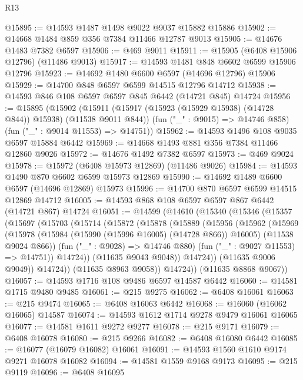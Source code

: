 \begin{lexlean}{R13}
\begin{coremodule}
@15895 := @14593 @1487 @1498 @9022 @9037 @15882 @15886
@15902 := @14668 @1484 @859 @356 @7384 @11466 @12787 @9013
@15905 := @14676 @1483 @7382 @6597
@15906 := @469 @9011
@15911 := @15905 (@6408 @15906 @12796) (@11486 @9013)
@15917 := @14593 @1481 @848 @6602 @6599 @15906 @12796
@15923 := @14692 @1480 @6600 @6597 (@14696 @12796) @15906
@15929 := @14700 @848 @6597 @6599 @14515 @12796 @14712
@15938 := @14593 @846 @108 @6597 @6597 @845 @6442 (@14721 @845) @14724
@15956 := @15895
    (@15902
      (@15911 (@15917 (@15923 (@15929 @15938) (@14728 @844)) @15938) (@11538 @9011 @844))
      (fun ("_" : @9015) => @14746 @858)
      (fun ("_" : @9014 @11553) => @14751))
@15962 := @14593 @1496 @108 @9035 @6597 @15884 @6442
@15969 := @14668 @1493 @881 @356 @7384 @11466 @12860 @9026
@15972 := @14676 @1492 @7382 @6597
@15973 := @469 @9024
@15978 := @15972 (@6408 @15973 @12869) (@11486 @9026)
@15984 := @14593 @1490 @870 @6602 @6599 @15973 @12869
@15990 := @14692 @1489 @6600 @6597 (@14696 @12869) @15973
@15996 := @14700 @870 @6597 @6599 @14515 @12869 @14712
@16005 := @14593 @868 @108 @6597 @6597 @867 @6442 (@14721 @867) @14724
@16051 := @14599
    (@14610
      (@15340
        (@15346
          (@15357
            (@15697
              (@15703
                (@15714
                  (@15872
                    (@15878
                      (@15889
                        (@15956
                          (@15962
                            (@15969
                              (@15978
                                (@15984 (@15990 (@15996 @16005) (@14728 @866)) @16005)
                                (@11538 @9024 @866))
                              (fun ("_" : @9028) => @14746 @880)
                              (fun ("_" : @9027 @11553) => @14751))
                            @14724))
                        (@11635 @9043 @9048))
                      @14724))
                  (@11635 @9006 @9049))
                @14724))
            (@11635 @8963 @9058))
          @14724))
      (@11635 @8868 @9067))
@16057 := @14593 @1716 @108 @9486 @6597 @14587 @6442
@16060 := @14581 @1715 @9480 @9485
@16061 := @215 @9275
@16062 := @6408 @16061
@16063 := @215 @9474
@16065 := @6408 @16063 @6442
@16068 := @16060 (@16062 @16065) @14587
@16074 := @14593 @1612 @1714 @9278 @9479 @16061 @16065
@16077 := @14581 @1611 @9272 @9277
@16078 := @215 @9171
@16079 := @6408 @16078
@16080 := @215 @9266
@16082 := @6408 @16080 @6442
@16085 := @16077 (@16079 @16082) @16061
@16091 := @14593 @1560 @1610 @9174 @9271 @16078 @16082
@16094 := @14581 @1559 @9168 @9173
@16095 := @215 @9119
@16096 := @6408 @16095

\end{coremodule}
\end{lexlean}
